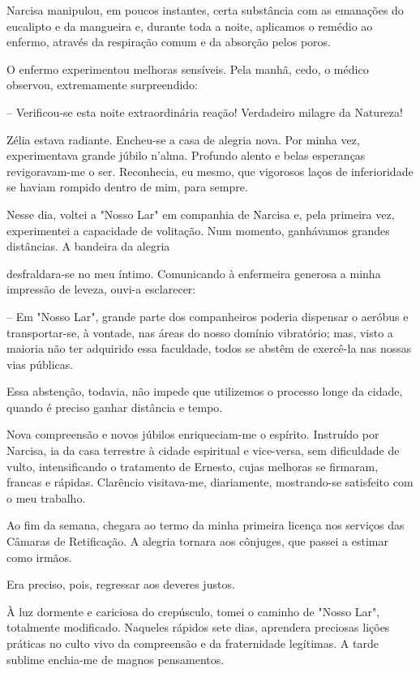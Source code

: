 \documentclass[portuguese,12pt,a4paper]{scrbook}
\begin{document}
	Narcisa manipulou, em poucos instantes, certa substância com as emanações do eucalipto e da mangueira e, durante toda a noite, aplicamos o remédio ao enfermo, através da respiração comum e da absorção pelos poros.
	
	O enfermo experimentou melhoras sensíveis. Pela manhã, cedo, o médico observou, extremamente surpreendido:
	
	– Verificou-se esta noite extraordinária reação! Verdadeiro milagre da Natureza!
	
	Zélia estava radiante. Encheu-se a casa de alegria nova. Por minha vez, experimentava grande júbilo n’alma. Profundo alento e belas esperanças revigoravam-me o ser. Reconhecia, eu mesmo, que vigorosos laços de inferioridade se haviam rompido dentro de mim, para sempre.
	
	Nesse dia, voltei a "Nosso Lar" em companhia de Narcisa e, pela primeira vez, experimentei a capacidade de volitação. Num momento, ganhávamos grandes distâncias. A bandeira da alegria
	
	
	desfraldara-se no meu íntimo. Comunicando à enfermeira generosa a minha impressão de leveza, ouvi-a esclarecer:
	
	– Em "Nosso Lar", grande parte dos companheiros poderia dispensar o aeróbus e transportar-se, à vontade, nas áreas do nosso domínio vibratório; mas, visto a maioria não ter adquirido essa faculdade, todos se abstêm de exercê-la nas nossas vias públicas.
	
	Essa abstenção, todavia, não impede que utilizemos o processo longe da cidade, quando é preciso ganhar distância e tempo.
	
	Nova compreensão e novos júbilos enriqueciam-me o espírito. Instruído por Narcisa, ia da casa terrestre à cidade espiritual e vice-versa, sem dificuldade de vulto, intensificando o tratamento de Ernesto, cujas melhoras se firmaram, francas e rápidas. Clarêncio visitava-me, diariamente, mostrando-se satisfeito com o meu trabalho.
	
	Ao fim da semana, chegara ao termo da minha primeira licença nos serviços das Câmaras de Retificação. A alegria tornara aos cônjuges, que passei a estimar como irmãos.
	
	Era preciso, pois, regressar aos deveres justos.
	
	À luz dormente e cariciosa do crepúsculo, tomei o caminho de "Nosso Lar", totalmente modificado. Naqueles rápidos sete dias, aprendera preciosas lições práticas no culto vivo da compreensão e da fraternidade legítimas. A tarde sublime enchia-me de magnos pensamentos.
	
\end{document}
